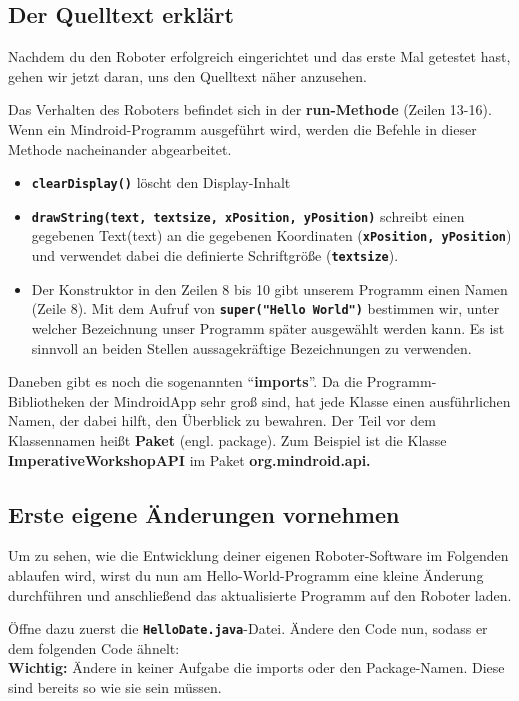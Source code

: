 \documentclass[
	12pt,
	article,
	type=bsc, %
	colorbacktitle,
	instlogo,
	accentcolor=tud1c,
	draft,
	german,
	twoside
]{tudexercise}
\newcommand{\solpath}[0]{../../impl/androidApp/app/src/main/java/org/mindroid/android/app/programs/workshop/solutions}
\newcommand{\bfcode}[1]{\texttt{\textbf{#1}}}
\begin{document}
	\subsection{Der Quelltext erklärt}
	Nachdem du den Roboter erfolgreich eingerichtet und das erste Mal getestet hast, gehen wir jetzt daran, uns den Quelltext näher anzusehen.
	
	Das Verhalten des Roboters befindet sich in der \textbf{run-Methode }(Zeilen 13-16). Wenn ein Mindroid-Programm ausgeführt wird, werden die Befehle in dieser Methode nacheinander abgearbeitet.
		\begin{itemize}
		\item{\bfcode{clearDisplay()}} löscht den Display-Inhalt
		\item{\bfcode{drawString(text, textsize, xPosition, yPosition)}} schreibt einen gegebenen Text(text) an die gegebenen Koordinaten (\bfcode{xPosition, yPosition}) und verwendet dabei die definierte Schriftgröße (\bfcode{textsize}).
		\item Der Konstruktor in den Zeilen 8 bis 10 gibt unserem Programm einen Namen (Zeile 8). Mit dem Aufruf von \bfcode{super("Hello World")} bestimmen wir, unter welcher Bezeichnung unser Programm später ausgewählt werden kann. Es ist sinnvoll an beiden Stellen aussagekräftige Bezeichnungen zu verwenden.
		\end{itemize}
		Daneben gibt es noch die sogenannten “\textbf{imports}”. Da die Programm-Bibliotheken der MindroidApp sehr groß sind, hat jede Klasse einen ausführlichen Namen, der dabei hilft, den Überblick zu bewahren. Der Teil vor dem Klassennamen heißt \textbf{Paket} (engl. package). Zum Beispiel ist die Klasse \textbf{ImperativeWorkshopAPI} im Paket \textbf{org.mindroid.api.}
		
		\subsection{Erste eigene Änderungen vornehmen}
		Um zu sehen, wie die Entwicklung deiner eigenen Roboter-Software im Folgenden ablaufen wird, wirst du nun am Hello-World-Programm eine kleine Änderung durchführen und anschließend das aktualisierte Programm auf den Roboter laden.
		
		Öffne dazu zuerst die \bfcode{HelloDate.java}-Datei. Ändere den Code nun, sodass er dem folgenden Code ähnelt:\\
		\textbf{Wichtig:} Ändere in keiner Aufgabe die imports oder den Package-Namen. Diese sind bereits so wie sie sein müssen.
		
\end{document}
